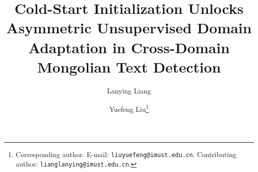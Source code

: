 \documentclass[11pt,a4paper]{article}

\usepackage[margin=2.2cm]{geometry}
\usepackage{graphicx}
\usepackage{amsmath,amssymb}
\usepackage{booktabs}
\usepackage{multirow}
\usepackage{float}
\usepackage{xcolor}
\usepackage{url}
\usepackage{hyperref}
\usepackage{authblk}
\hypersetup{colorlinks=true,linkcolor=blue,citecolor=blue,urlcolor=blue}

\newcommand{\hmean}{H\textsubscript{mean}}
\newcommand{\hsource}{H{\rightarrow}S}
\newcommand{\stoh}{S{\rightarrow}H}
\newcommand{\TODO}[1]{\textcolor{red}{[TODO: #1]}}

\providecommand{\corref}[1]{}
\providecommand{\cortext}[2]{}
\providecommand{\ead}[1]{\\\texttt{#1}}
\newenvironment{keyword}{\vspace{6pt}\noindent\textbf{Keywords:} }{\par\vspace{6pt}}
\providecommand{\sep}{,}

\title{Cold-Start Initialization Unlocks Asymmetric Unsupervised Domain
       Adaptation in Cross-Domain Mongolian Text Detection}
\author[1]{Lanying Liang}
\author[2]{Yuefeng Liu\thanks{Corresponding author. E-mail: \texttt{liuyuefeng@imust.edu.cn}.
  Contributing author: \texttt{lianglanying@imust.edu.cn}.}}
\date{}


\maketitle



\begin{keyword}
text detection \sep unsupervised domain adaptation \sep self-training \sep
Mongolian script \sep cross-domain learning \sep teacher--student
\end{keyword}

